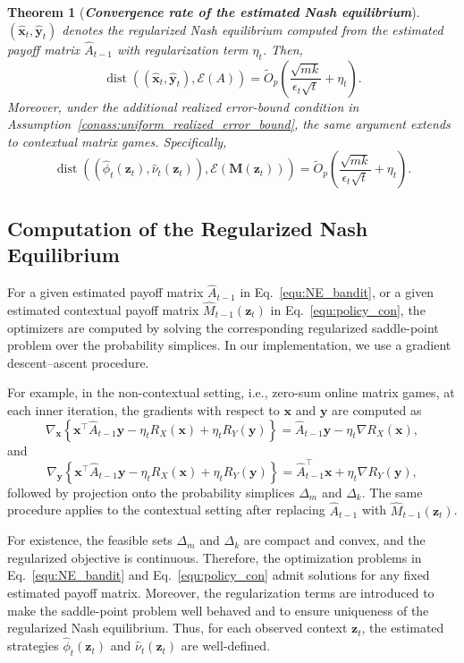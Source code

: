 \documentclass[12pt]{article}
\newtheorem{theorem}{Theorem}
\begin{document}
\begin{theorem}[\textbf{\emph{Convergence rate of the estimated Nash equilibrium}}]
\label{thm:rate_nash_rate}
$(\widehat{\bm x}_t,\widehat{\bm y}_t)$ denotes the regularized Nash equilibrium computed from the estimated payoff matrix $\widehat A_{t-1}$ with regularization term $\eta_t$. Then,
\[
\operatorname{dist}
\left(
(\widehat{\bm x}_t,\widehat{\bm y}_t),
\mathcal E(A)
\right)
=
\widetilde O_p
\left(
\frac{\sqrt{mk}}{\epsilon_t\sqrt t}
+
\eta_t
\right).
\]
Moreover, under the additional realized error-bound condition in Assumption~\ref{conass:uniform_realized_error_bound}, the same argument extends to contextual matrix games. Specifically,
\[
\operatorname{dist}
\left(
(
\widehat\phi_t(\bm z_t),
\widehat\nu_t(\bm z_t)
),
\mathcal E(\bm M(\bm z_t))
\right)
=
\widetilde O_p
\left(
\frac{\sqrt{mk}}{\epsilon_t\sqrt t}
+
\eta_t
\right).
\]
\end{theorem}

\subsection{Computation of the Regularized Nash Equilibrium}
\label{app:computation}

For a given estimated payoff matrix $\widehat A_{t-1}$ in Eq.~\eqref{equ:NE_bandit}, or a given estimated contextual payoff matrix $\widehat M_{t-1}(\bm{z}_t)$ in Eq.~\eqref{equ:policy_con}, the optimizers are computed by solving the corresponding regularized saddle-point problem over the probability simplices. In our implementation, we use a gradient descent--ascent procedure.

For example, in the non-contextual setting, i.e., zero-sum online matrix games, at each inner iteration, the gradients with respect to $\bm{x}$ and $\bm{y}$ are computed as
\[
\nabla_{\bm{x}}
\left\{
\bm{x}^\top \widehat A_{t-1}\bm{y}
-\eta_t R_X(\bm{x})
+\eta_t R_Y(\bm{y})
\right\}
=
\widehat A_{t-1}\bm{y}
-\eta_t\nabla R_X(\bm{x}),
\]
and
\[
\nabla_{\bm{y}}
\left\{
\bm{x}^\top \widehat A_{t-1}\bm{y}
-\eta_t R_X(\bm{x})
+\eta_t R_Y(\bm{y})
\right\}
=
\widehat A_{t-1}^\top\bm{x}
+\eta_t\nabla R_Y(\bm{y}),
\]
followed by projection onto the probability simplices $\Delta_m$ and $\Delta_k$. The same procedure applies to the contextual setting after replacing $\widehat A_{t-1}$ with $\widehat M_{t-1}(\bm{z}_t)$.

For existence, the feasible sets $\Delta_m$ and $\Delta_k$ are compact and convex, and the regularized objective is continuous. Therefore, the optimization problems in Eq.~\eqref{equ:NE_bandit} and Eq.~\eqref{equ:policy_con} admit solutions for any fixed estimated payoff matrix. Moreover, the regularization terms are introduced to make the saddle-point problem well behaved and to ensure uniqueness of the regularized Nash equilibrium. Thus, for each observed context $\bm{z}_t$, the estimated strategies $\widehat\phi_t(\bm{z}_t)$ and $\widehat\nu_t(\bm{z}_t)$ are well-defined.
\end{document}
